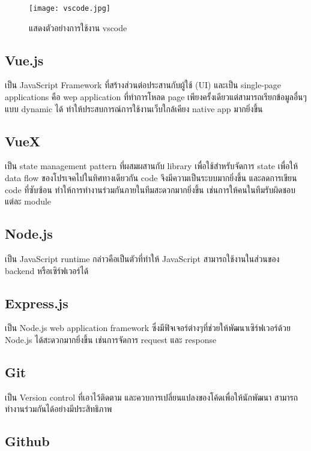 \begin{figure}[H]
  \centering
  \texttt{[image: vscode.jpg]}
  \caption{แสดงตัวอย่างการใช้งาน vscode}
  \label{Fig:vscode}
\end{figure}

\subsection{Vue.js}

เป็น JavaScript Framework ที่สร้างส่วนต่อประสานกับผู้ใช้ (UI) และเป็น single-page applications คือ wep application ที่ทำการโหลด page เพียงครั้งเดียวแต่สามารถเรียกข้อมูลอื่นๆแบบ dynamic ได้ ทำให้ประสบการณ์การใช้งานเว็บใกล้เคียง native app มากยิ่งขึ้น

\subsection{VueX}

เป็น state management pattern ที่ผสมผสานกับ library เพื่อใช้สำหรับจัดการ state เพื่อให้ data flow ของโปรเจคไปในทิศทางเดียวกัน code จึงมีความเป็นระบบมากยิ่งขึ้น และลดการเขียน code ที่ซับซ้อน ทำให้การทำงานร่วมกันภายในทีมสะดวกมากยิ่งขึ้น เช่นการให้คนในทีมรับผิดชอบแต่ละ module~\cite{vuex}

\subsection{Node.js}

เป็น JavaScript runtime กล่าวคือเป็นตัวที่ทำให้ JavaScript  สามารถใช้งานในส่วนของ backend หรือเซิร์ฟเวอร์ได้

\subsection{Express.js}

เป็น Node.js web application framework  ซึ่งมีฟิจเจอร์ต่างๆที่ช่วยให้พัฒนาเซิร์ฟเวอร์ด้วย Node.js ได้สะดวกมากยิ่งขึ้น เช่นการจัดการ request และ response

\subsection{Git}

เป็น Version control ที่เอาไว้ติดตาม และควบการเปลี่ยนแปลงของโค้ดเพื่อให้นักพัฒนา สามารถทำงานร่วมกันได้อย่างมีประสิทธิภาพ~\cite{git}

\subsection{Github}

